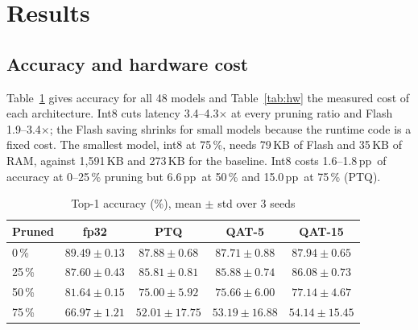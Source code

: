 \documentclass[conference]{IEEEtran}
\newcommand{\pp}{\,pp}
\begin{document}
\section{Results}

\subsection{Accuracy and hardware cost}
Table~\ref{tab:acc} gives accuracy for all 48 models and Table~\ref{tab:hw} the measured cost of each architecture. Int8 cuts latency 3.4--4.3$\times$ at every pruning ratio and Flash 1.9--3.4$\times$; the Flash saving shrinks for small models because the runtime code is a fixed cost. The smallest model, int8 at 75\,\%, needs 79\,KB of Flash and 35\,KB of RAM, against 1{,}591\,KB and 273\,KB for the baseline. Int8 costs 1.6--1.8\pp\ of accuracy at 0--25\,\% pruning but 6.6\pp\ at 50\,\% and 15.0\pp\ at 75\,\% (PTQ).

\begin{table}[t]
\caption{Top-1 accuracy (\%), mean $\pm$ std over 3 seeds}
\label{tab:acc}
\centering
\setlength{\tabcolsep}{4pt}
\begin{tabular}{@{}lcccc@{}}
\toprule
Pruned & fp32 & PTQ & QAT-5 & QAT-15 \\
\midrule
0\,\%  & $89.49 \pm 0.13$ & $87.88 \pm 0.68$ & $87.71 \pm 0.88$ & $87.94 \pm 0.65$ \\
25\,\% & $87.60 \pm 0.43$ & $85.81 \pm 0.81$ & $85.88 \pm 0.74$ & $86.08 \pm 0.73$ \\
50\,\% & $81.64 \pm 0.15$ & $75.00 \pm 5.92$ & $75.66 \pm 6.00$ & $77.14 \pm 4.67$ \\
75\,\% & $66.97 \pm 1.21$ & $52.01 \pm 17.75$ & $53.19 \pm 16.88$ & $54.14 \pm 15.45$ \\
\bottomrule
\end{tabular}
\end{table}
\end{document}
